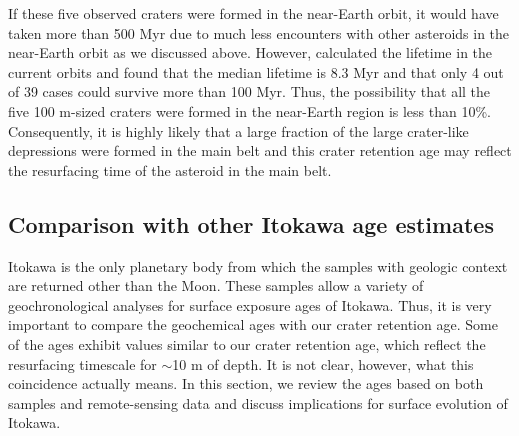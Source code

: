 \documentclass[3p,authoryear]{elsarticle}
\newcommand{\red}[1]{\textcolor{red}{#1}}
\begin{document}
If these five observed craters were formed in the near-Earth orbit, it would have taken more than 500 Myr due to much less encounters with other asteroids in the near-Earth orbit as we discussed above.
However, \citet{michel2005} calculated the lifetime in the current orbits and found that the median lifetime is 8.3 Myr and that only 4 out of 39 cases could survive more than 100 Myr.
Thus, the possibility that all the five 100 m-sized craters were formed in the near-Earth region is less than 10\%.
Consequently, it is highly likely that a large fraction of the large crater-like depressions were formed in the main belt and this crater retention age may reflect the resurfacing  time of the asteroid in the main belt.
\begin{comment}
This has an important implication for resurfacing on Itokawa in its near-Earth orbit.
Although many NEAs, such as Q-type asteroids, may experienced major resurfacing presumably due to tidal force upon close encounters to terrestrial planets ({binzel2010}), Itokawa probably did not experience such extensive resurfacing after it entered its near-Earth orbit.
Otherwise, its crater retention age would be much younger.
\end{comment}

\subsection{Comparison with other Itokawa age estimates}\label{sec:itokawa-sample}
Itokawa is the only planetary body from which the samples with geologic context are returned other than the Moon. These samples allow a variety of geochronological analyses for surface exposure ages of Itokawa. Thus, it is very important to compare the geochemical ages with our crater retention age. Some of the ages exhibit values similar to our crater retention age, which reflect the resurfacing timescale for $\sim$10 m of depth. It is not clear, however, what this coincidence actually means. In this section, we review the ages based on both samples and remote-sensing data and discuss implications for surface evolution of Itokawa.
\end{document}

